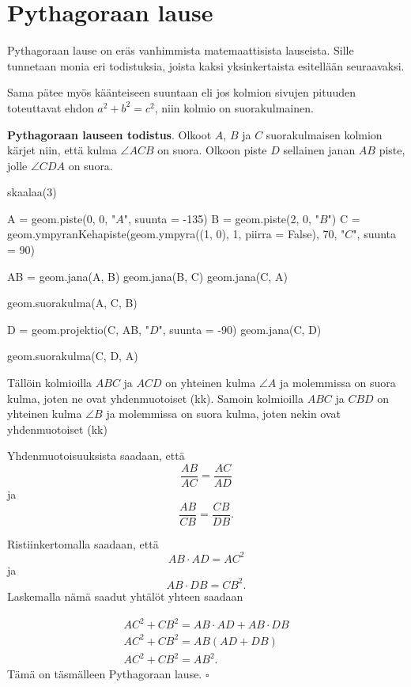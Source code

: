 \section{Pythagoraan lause}

Pythagoraan lause on eräs vanhimmista matemaattisista lauseista. Sille tunnetaan monia eri
todistuksia, joista kaksi yksinkertaista esitellään seuraavaksi.


Sama pätee myös käänteiseen suuntaan eli jos kolmion sivujen pituuden toteuttavat ehdon $a^2 + b^2 = c^2$, niin kolmio on suorakulmainen.

\textbf{Pythagoraan lauseen todistus}. Olkoot $A$, $B$ ja $C$ suorakulmaisen kolmion
kärjet niin, että kulma $\angle ACB$ on suora. Olkoon piste $D$ sellainen janan $AB$ piste,
jolle $\angle CDA$ on suora.

\begin{kuva}
skaalaa(3)

A = geom.piste(0, 0, "$A$", suunta = -135)
B = geom.piste(2, 0, "$B$")
C = geom.ympyranKehapiste(geom.ympyra((1, 0), 1, piirra = False), 70, "$C$", suunta = 90)

AB = geom.jana(A, B)
geom.jana(B, C)
geom.jana(C, A)

geom.suorakulma(A, C, B)

D = geom.projektio(C, AB, "$D$", suunta = -90)
geom.jana(C, D)

geom.suorakulma(C, D, A)


\end{kuva}

Tällöin kolmioilla $ABC$ ja $ACD$ on yhteinen kulma $\angle A$ ja molemmissa on suora kulma, joten ne ovat yhdenmuotoiset (kk). Samoin kolmioilla $ABC$ ja $CBD$ on yhteinen kulma
$\angle B$ ja molemmissa on suora kulma, joten nekin ovat yhdenmuotoiset (kk)

Yhdenmuotoisuuksista saadaan, että
\[
\frac{AB}{AC} = \frac{AC}{AD}
\]
ja
\[
\frac{AB}{CB} = \frac{CB}{DB}.
\]

Ristiinkertomalla saadaan, että
\[
AB \cdot AD = AC^2
\]
ja
\[
AB \cdot DB = CB^2.
\]
Laskemalla nämä saadut yhtälöt yhteen saadaan

\begin{align*}
AC^2 + CB^2  = AB \cdot AD + AB \cdot DB \\
AC^2 + CB^2  = AB(AD + DB) \\
AC^2 + CB^2  = AB^2.
\end{align*}
Tämä on täsmälleen Pythagoraan lause. $\square $

